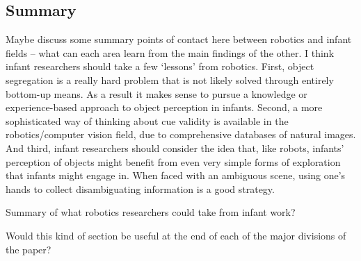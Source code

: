 \subsection{Summary}

Maybe discuss some summary points of contact here between robotics and
infant fields -- what can each area learn from the main findings
of the other.  I think infant researchers should take a few
`lessons' from robotics.  First, object segregation is
a really hard problem that is not likely solved through entirely
bottom-up means.  As a result it makes sense to pursue a knowledge or
experience-based approach to object perception in infants.  Second, a
more sophisticated way of thinking about cue validity is available in
the robotics/computer vision field, due to comprehensive databases of
natural images.  And third, infant researchers should consider the
idea that, like robots, infants' perception of objects might
benefit from even very simple forms of exploration that infants might
engage in.  When faced with an ambiguous scene, using one's
hands to collect disambiguating information is a good strategy.

Summary of what robotics researchers could take from infant work?

Would this kind of section be useful at the end of each of the major
divisions of the paper?

